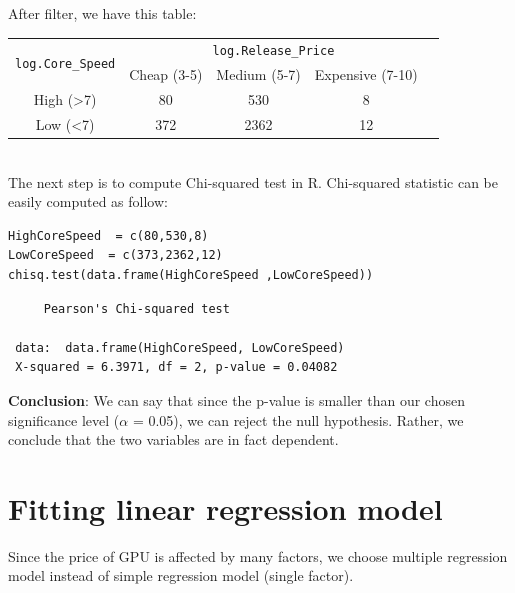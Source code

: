 \documentclass[a4paper]{article}
\begin{document}
After filter, we have this table:
\begin{table}[!htb]
\centering
\begin{tabular}{|c|ccc|c}
\cline{1-4}
\multirow{2}{*}{\texttt{log.Core\_Speed}} & \multicolumn{3}{c|}{\texttt{log.Release\_Price}}                                                                       &  \\ \cline{2-4}
                                & \multicolumn{1}{l|}{Cheap (3-5)} & \multicolumn{1}{l|}{Medium (5-7)} & \multicolumn{1}{l|}{Expensive (7-10)} &  \\ \cline{1-4}
High (\textgreater{}7)           & \multicolumn{1}{c|}{80}         & \multicolumn{1}{c|}{530}         & 8                                    &  \\ \cline{1-4}
Low (\textless{}7)               & \multicolumn{1}{c|}{372}        & \multicolumn{1}{c|}{2362}        & 12                                   &  \\ \cline{1-4}
\end{tabular}
\end{table}\\
The next step is to compute Chi-squared test in R. Chi-squared statistic can be easily computed as follow:
\begin{mdframed}[leftline=false,rightline=false,backgroundcolor=lightblue!10,nobreak=false]
    \begin{verbatim}
HighCoreSpeed  = c(80,530,8)
LowCoreSpeed  = c(373,2362,12)
chisq.test(data.frame(HighCoreSpeed ,LowCoreSpeed))
    \end{verbatim}
\end{mdframed}

\begin{lstlisting}
     Pearson's Chi-squared test

 data:  data.frame(HighCoreSpeed, LowCoreSpeed)
 X-squared = 6.3971, df = 2, p-value = 0.04082
\end{lstlisting}
\textbf{Conclusion}: We can say that since the p-value is smaller than our chosen significance level ($\alpha$ = 0.05), we can reject the null hypothesis. Rather, we conclude that the two variables are in fact dependent.


\section{Fitting linear regression model}
Since the price of GPU is affected by many factors, we choose multiple regression model instead of simple regression model (single factor).
\end{document}
